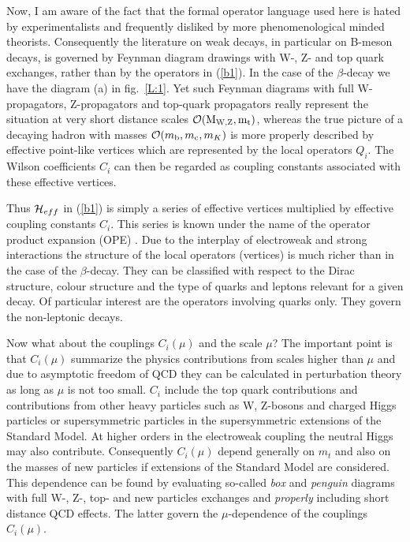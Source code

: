 \documentclass[12pt,rotate]{article}
\newcommand{\mc}{m_{\rm c}}
\newcommand{\mb}{m_{\rm b}}
\newcommand{\ord}{{\cal O}}
\begin{document}
Now, I am aware of the fact that the formal operator language used here is
hated by experimentalists and frequently disliked by more phenomenological
minded theorists. Consequently the literature on weak decays, in particular
on B-meson decays, is governed by Feynman diagram drawings with W-, Z- and top
quark exchanges, rather than by the operators in (\ref{b1}). 
In the case of the $\beta$-decay we have the diagram (a) in fig.~\ref{L:1}.
Yet such Feynman
diagrams with full W-propagators, Z-propagators and top-quark propagators
really represent the situation at very short distance scales 
$\ord ({\rm M_{W,Z}, m_t})$, whereas the
true picture of a decaying hadron with masses 
$\ord(\mb,\mc,m_K)$ is more properly described by
effective point-like vertices which are represented by the local operators
$Q_i$. The Wilson coefficients $C_i$ can then be regarded as coupling constants
associated with these effective vertices.

Thus ${\cal H}_{eff}$ in (\ref{b1}) is simply a series of effective 
vertices multiplied 
by effective coupling constants $C_i$. This series is known under the name 
of the operator product expansion (OPE) \cite{OPE,ZIMM,WIT}. 
Due to the interplay of electroweak 
and strong interactions the structure of the local operators (vertices) is 
much richer than in the case of the $\beta$-decay. They can be classified 
with respect to the Dirac structure, colour structure and the type of quarks 
and leptons relevant for a given decay. Of particular interest are the 
operators involving quarks only. They govern the non-leptonic decays.

Now what about the couplings $C_i(\mu)$ and the scale $\mu$? The 
important point is that $C_i(\mu)$
summarize the physics contributions from scales higher than $\mu$ and due to
asymptotic freedom of QCD they can be calculated in perturbation theory as
long as $\mu$ is not too small. $C_i$ include the top quark contributions and
contributions from other heavy particles such as W, Z-bosons and charged
Higgs particles or supersymmetric particles in the supersymmetric extensions
of the Standard Model. At higher orders in the electroweak coupling the
neutral Higgs may also contribute. Consequently $C_i(\mu)$ depend generally 
on $m_t$ and also on the masses of new particles if extensions of the 
Standard Model are considered. This dependence can be found by evaluating 
so-called {\it box} and {\it penguin} diagrams with full W-, Z-, top- and 
new particles exchanges and {\it properly} including short distance QCD 
effects. The latter govern the $\mu$-dependence of the couplings $C_i(\mu)$.
\end{document}
